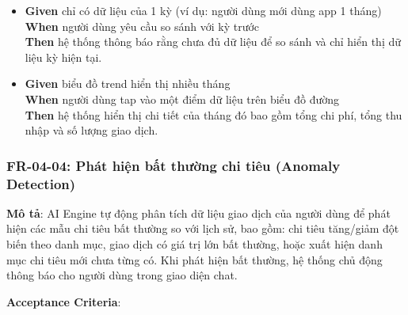 \begin{itemize}
\item \textbf{Given} chỉ có dữ liệu của 1 kỳ (ví dụ: người dùng mới dùng app 1 tháng)  \\ \hspace*{1.5em}  \textbf{When} người dùng yêu cầu so sánh với kỳ trước  \\ \hspace*{1.5em}  \textbf{Then} hệ thống thông báo rằng chưa đủ dữ liệu để so sánh và chỉ hiển thị dữ liệu kỳ hiện tại.
\item \textbf{Given} biểu đồ trend hiển thị nhiều tháng  \\ \hspace*{1.5em}  \textbf{When} người dùng tap vào một điểm dữ liệu trên biểu đồ đường  \\ \hspace*{1.5em}  \textbf{Then} hệ thống hiển thị chi tiết của tháng đó bao gồm tổng chi phí, tổng thu nhập và số lượng giao dịch.
\end{itemize}
\subsubsection{FR-04-04: Phát hiện bất thường chi tiêu (Anomaly Detection)}

\textbf{Mô tả}: AI Engine tự động phân tích dữ liệu giao dịch của người dùng để phát hiện các mẫu chi tiêu bất thường so với lịch sử, bao gồm: chi tiêu tăng/giảm đột biến theo danh mục, giao dịch có giá trị lớn bất thường, hoặc xuất hiện danh mục chi tiêu mới chưa từng có. Khi phát hiện bất thường, hệ thống chủ động thông báo cho người dùng trong giao diện chat.



\textbf{Acceptance Criteria}:

